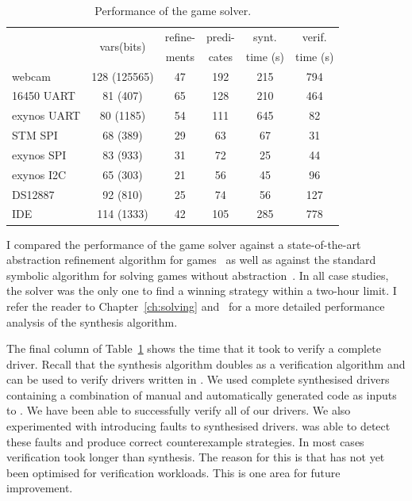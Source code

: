 \begin{table}
    \center
    \begin{tabular}{|l|ccccc|}
        \hline
                       & \multirow{2}{*}{vars(bits)} & refine- & predi- & synt.     & verif.   \\
                       &                             & ments   & cates  & time (s)  & time (s) \\
        \hline
        \hline
        webcam         & 128 (125565)                & 47      & 192    & 215       & 794 \\
        16450 UART     & 81  (407)                   & 65      & 128    & 210       & 464 \\
        exynos UART    & 80  (1185)                  & 54      & 111    & 645       & 82 \\
        STM SPI        & 68  (389)                   & 29      & 63     & 67        & 31 \\
        exynos SPI     & 83  (933)                   & 31      & 72     & 25        & 44 \\
        exynos I2C     & 65  (303)                   & 21      & 56     & 45        & 96 \\
        DS12887       & 92  (810)                   & 25      & 74     & 56        & 127 \\
        IDE            & 114 (1333)                  & 42      & 105    & 285       & 778 \\
        \hline
    \end{tabular}
    \caption{Performance of the \termite game solver.}
    \label{t:perf}
\end{table}

I compared the performance of the \termite game solver against a state-of-the-art abstraction refinement algorithm for games~\cite{Alfaro_Roy_07} as well as against the standard symbolic algorithm for solving games without abstraction~\cite{Piterman_PS_06}.  In all case studies, the \termite solver was the only one to find a winning strategy within a two-hour limit.  I refer the reader to Chapter~\ref{ch:solving} and~\cite{Walker_Ryzhyk_14} for a more detailed performance analysis of the \termite synthesis algorithm.

The final column of Table~\ref{t:perf} shows the time that it took \termite to verify a complete driver.  Recall that the \termite synthesis algorithm doubles as a verification algorithm and can be used to verify drivers written in \tsl.  We used complete synthesised drivers containing a combination of manual and automatically generated code as inputs to \termite.  We have been able to successfully verify all of our drivers.  We also experimented with introducing faults to synthesised drivers.  \termite was able to detect these faults and produce correct counterexample strategies.  In most cases verification took longer than synthesis.  The reason for this is that \termite has not yet been optimised for verification workloads.  This is one area for future improvement.

